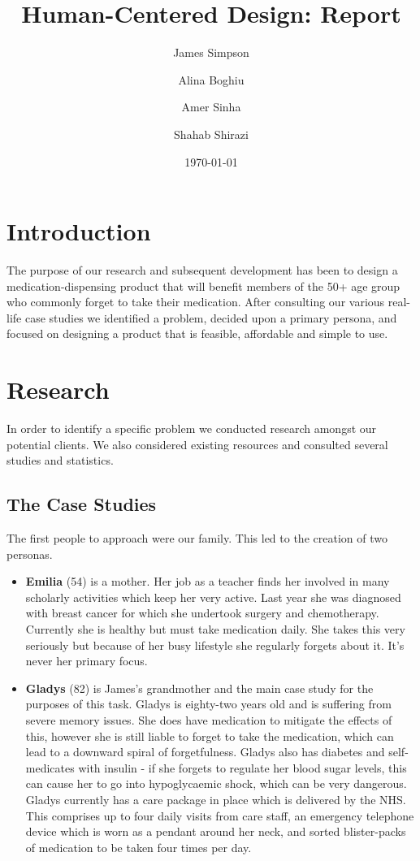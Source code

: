 \documentclass{article}
\begin{document}
\title{Human-Centered Design: Report}
\author{James Simpson \and Alina Boghiu \and Amer Sinha \and Shahab Shirazi}
\date{\today}
\maketitle

\section{Introduction}
The purpose of our research and subsequent development has been to design a medication-dispensing product that will benefit members of the 50+ age group who commonly forget to take their medication. After consulting our various real-life case studies we identified a problem, decided upon a primary persona, and focused on designing a product that is feasible, affordable and simple to use.

\section{Research}
In order to identify a specific problem we conducted research amongst our potential clients. We also considered existing resources and consulted several studies and statistics.

	\subsection{The Case Studies}
	The first people to approach were our family. This led to the creation of two personas.

	\begin{itemize}
	\item \textbf{Emilia} (54) is a mother. Her job as a teacher finds her involved in many scholarly activities which keep her very active. Last year she was diagnosed with breast cancer for which she undertook surgery and chemotherapy. Currently she is healthy but must take medication daily. She takes this very seriously but because of her busy lifestyle she regularly forgets about it. It's never her primary focus.

	\item \textbf{Gladys} (82) is James's grandmother and the main case study for the purposes of this task. Gladys is eighty-two years old and is suffering from severe memory issues. She does have medication to mitigate the effects of this, however she is still liable to forget to take the medication, which can lead to a downward spiral of forgetfulness. Gladys also has diabetes and self-medicates with insulin - if she forgets to regulate her blood sugar levels, this can cause her to go into hypoglycaemic shock, which can be very dangerous. Gladys currently has a care package in place which is delivered by the NHS. This comprises up to four daily visits from care staff, an emergency telephone device which is worn as a pendant around her neck, and sorted blister-packs of medication to be taken four times per day.
	\end{itemize}
\end{document}
